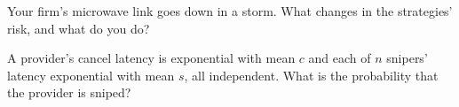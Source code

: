 \begin{interviewq}\label{iq:hf:latency-arbitrage-and-its-defence:5}
Your firm's microwave link goes down in a storm. What changes in the strategies' risk, and what do you do?
\end{interviewq}

\begin{interviewq}\label{iq:hf:latency-arbitrage-and-its-defence:6}
A provider's cancel latency is exponential with mean $c$ and each of $n$ snipers' latency exponential with mean $s$, all independent. What is the
probability that the provider is sniped?
\end{interviewq}
